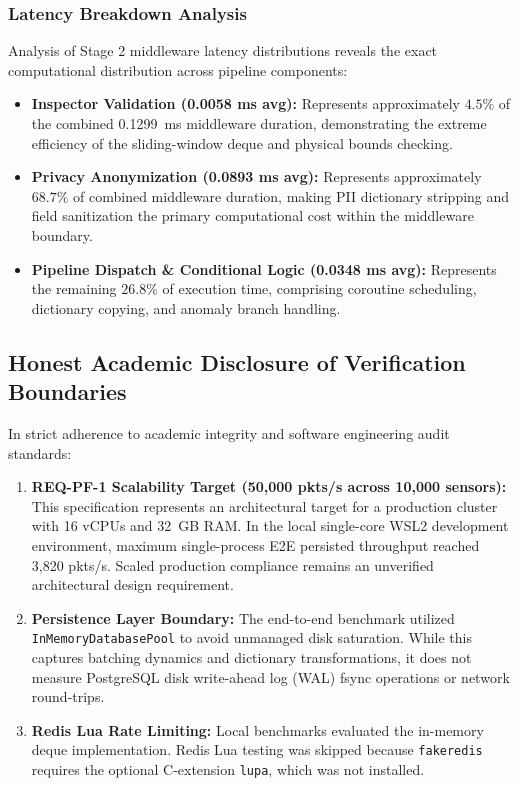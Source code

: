 \subsubsection{Latency Breakdown Analysis}
Analysis of Stage 2 middleware latency distributions reveals the exact computational distribution across pipeline components:
\begin{itemize}
    \item \textbf{Inspector Validation (0.0058 ms avg):} Represents approximately $4.5\%$ of the combined 0.1299~ms middleware duration, demonstrating the extreme efficiency of the sliding-window deque and physical bounds checking.
    \item \textbf{Privacy Anonymization (0.0893 ms avg):} Represents approximately $68.7\%$ of combined middleware duration, making PII dictionary stripping and field sanitization the primary computational cost within the middleware boundary.
    \item \textbf{Pipeline Dispatch \& Conditional Logic (0.0348 ms avg):} Represents the remaining $26.8\%$ of execution time, comprising coroutine scheduling, dictionary copying, and anomaly branch handling.
\end{itemize}

\subsection{Honest Academic Disclosure of Verification Boundaries}
In strict adherence to academic integrity and software engineering audit standards:
\begin{enumerate}
    \item \textbf{REQ-PF-1 Scalability Target (50,000 pkts/s across 10,000 sensors):} This specification represents an architectural target for a production cluster with 16 vCPUs and 32~GB RAM. In the local single-core WSL2 development environment, maximum single-process E2E persisted throughput reached 3,820 pkts/s. Scaled production compliance remains an unverified architectural design requirement.
    \item \textbf{Persistence Layer Boundary:} The end-to-end benchmark utilized \texttt{InMemoryDatabasePool} to avoid unmanaged disk saturation. While this captures batching dynamics and dictionary transformations, it does not measure PostgreSQL disk write-ahead log (WAL) fsync operations or network round-trips.
    \item \textbf{Redis Lua Rate Limiting:} Local benchmarks evaluated the in-memory deque implementation. Redis Lua testing was skipped because \texttt{fakeredis} requires the optional C-extension \texttt{lupa}, which was not installed.
\end{enumerate}
